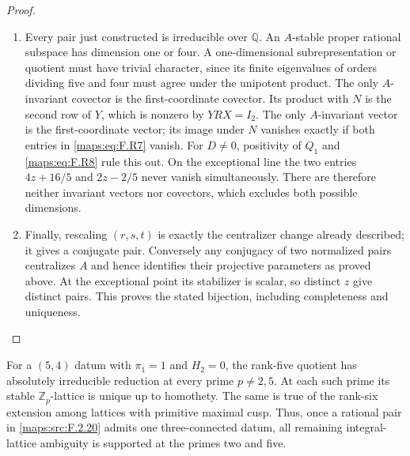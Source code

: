\begin{proof}
\begin{enumerate}[label={$\langle1\rangle$\arabic*.}]
\item Every pair just constructed is irreducible over $\mathbb Q$.
An $A$-stable proper rational subspace has dimension one or
four.  A one-dimensional subrepresentation or quotient must
have trivial character, since its finite eigenvalues of
orders dividing five and four must agree under the
unipotent product.  The only $A$-invariant covector is the
first-coordinate covector.  Its product with $N$ is the
second row of $Y$, which is nonzero by $YRX=I_2$.
The only $A$-invariant vector is the first-coordinate vector;
its image under $N$ vanishes exactly if both entries in
\eqref{maps:eq:F.R7} vanish.  For $D\ne0$, positivity of $Q_1$ and
\eqref{maps:eq:F.R8} rule this out.  On the exceptional line the two
entries $4z+16/5$ and $2z-2/5$ never vanish simultaneously.
There are therefore neither invariant vectors nor covectors,
which excludes both possible dimensions.

\item Finally, rescaling $(r,s,t)$ is exactly the centralizer
change already described; it gives a conjugate pair.
Conversely any conjugacy of two normalized pairs centralizes
$A$ and hence identifies their projective parameters as proved
above.  At the exceptional point its stabilizer is scalar,
so distinct $z$ give distinct pairs.  This proves the stated
bijection, including completeness and uniqueness.

\end{enumerate}
\end{proof}




\begin{corollary}\hypertarget{tag-02NB}{}\label{maps:src:F.2.21}


For a $(5,4)$ datum with $\pi_1=1$ and $H_2=0$, the
rank-five quotient has absolutely irreducible reduction
at every prime $p\ne2,5$.  At each such prime its stable
$\mathbb Z_p$-lattice is unique up to homothety.
The same is true of the rank-six extension among lattices
with primitive maximal cusp.  Thus, once a rational pair
in \ref{maps:src:F.2.20} admits one three-connected datum, all remaining integral-lattice
ambiguity is supported at the primes two and five.


\end{corollary}


